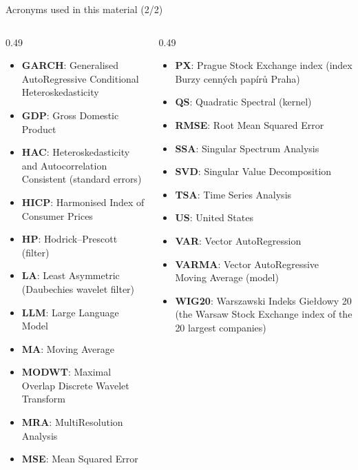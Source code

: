 \begin{frame}{Acronyms used in this material (2/2)}
\begin{columns}[T]
\begin{column}{0.49\textwidth}
\begin{itemize}\setlength{\itemsep}{0pt}
    \item \textbf{GARCH}: Generalised AutoRegressive Conditional Heteroskedasticity
    \item \textbf{GDP}: Gross Domestic Product
    \item \textbf{HAC}: Heteroskedasticity and Autocorrelation Consistent (standard errors)
    \item \textbf{HICP}: Harmonised Index of Consumer Prices
    \item \textbf{HP}: Hodrick–Prescott (filter)
    \item \textbf{LA}: Least Asymmetric (Daubechies wavelet filter)
    \item \textbf{LLM}: Large Language Model
    \item \textbf{MA}: Moving Average
    \item \textbf{MODWT}: Maximal Overlap Discrete Wavelet Transform
    \item \textbf{MRA}: MultiResolution Analysis
    \item \textbf{MSE}: Mean Squared Error
\end{itemize}
\end{column}
\begin{column}{0.49\textwidth}
\begin{itemize}\setlength{\itemsep}{0pt}
    \item \textbf{PX}: Prague Stock Exchange index (index Burzy cenných papírů Praha)
    \item \textbf{QS}: Quadratic Spectral (kernel)
    \item \textbf{RMSE}: Root Mean Squared Error
    \item \textbf{SSA}: Singular Spectrum Analysis
    \item \textbf{SVD}: Singular Value Decomposition
    \item \textbf{TSA}: Time Series Analysis
    \item \textbf{US}: United States
    \item \textbf{VAR}: Vector AutoRegression
    \item \textbf{VARMA}: Vector AutoRegressive Moving Average (model)
    \item \textbf{WIG20}: Warszawski Indeks Giełdowy 20 (the Warsaw Stock Exchange index of the 20 largest companies)
\end{itemize}
\end{column}
\end{columns}
\end{frame}

